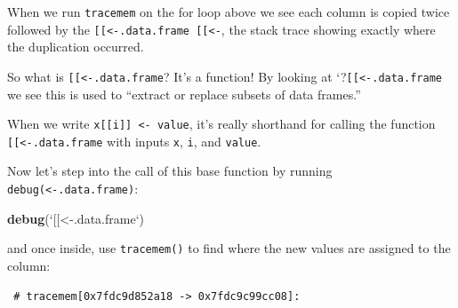 \documentclass[]{book}
\newenvironment{Shaded}{\begin{snugshade}}{\end{snugshade}}
\newcommand{\CommentTok}[1]{\textcolor[rgb]{0.56,0.35,0.01}{\textit{#1}}}
\newcommand{\ControlFlowTok}[1]{\textcolor[rgb]{0.13,0.29,0.53}{\textbf{#1}}}
\newcommand{\DataTypeTok}[1]{\textcolor[rgb]{0.13,0.29,0.53}{#1}}
\newcommand{\KeywordTok}[1]{\textcolor[rgb]{0.13,0.29,0.53}{\textbf{#1}}}
\newcommand{\NormalTok}[1]{#1}
\newcommand{\OperatorTok}[1]{\textcolor[rgb]{0.81,0.36,0.00}{\textbf{#1}}}
\newcommand{\OtherTok}[1]{\textcolor[rgb]{0.56,0.35,0.01}{#1}}
\newcommand{\StringTok}[1]{\textcolor[rgb]{0.31,0.60,0.02}{#1}}
\begin{document}
When we run \texttt{tracemem} on the for loop above we see each column is copied twice followed by the \texttt{{[}{[}\textless{}-.data.frame\ {[}{[}\textless{}-}, the stack trace showing exactly where the duplication occurred.

So what is \texttt{{[}{[}\textless{}-.data.frame}? It's a function! By looking at `?\texttt{{[}{[}\textless{}-.data.frame} we see this is used to ``extract or replace subsets of data frames.''

When we write \texttt{x{[}{[}i{]}{]}\ \textless{}-\ value}, it's really shorthand for calling the function \texttt{{[}{[}\textless{}-.data.frame} with inputs \texttt{x}, \texttt{i}, and \texttt{value}.

Now let's step into the call of this base function by running \texttt{debug(\textasciigrave{}\textasciigrave{}{[}{[}\textless{}-.data.frame\textasciigrave{}\textasciigrave{})}:

\begin{Shaded}
\begin{Highlighting}[]
\KeywordTok{debug}\NormalTok{(}\StringTok{`}\DataTypeTok{[[<-.data.frame}\StringTok{`}\NormalTok{)}
\end{Highlighting}
\end{Shaded}

and once inside, use \texttt{tracemem()} to find where the new values are assigned to the column:

\begin{Shaded}
\end{Shaded}

\begin{verbatim}
 # tracemem[0x7fdc9d852a18 -> 0x7fdc9c99cc08]: 
\end{verbatim}
\end{document}
